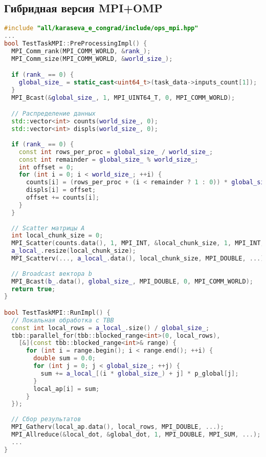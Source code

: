 \documentclass[12pt]{article}
\begin{document}
\subsection{Гибридная версия MPI+OMP}
\begin{lstlisting}[language=C++]
#include "all/karaseva_e_congrad/include/ops_mpi.hpp"
...
bool TestTaskMPI::PreProcessingImpl() {
  MPI_Comm_rank(MPI_COMM_WORLD, &rank_);
  MPI_Comm_size(MPI_COMM_WORLD, &world_size_);

  if (rank_ == 0) {
    global_size_ = static_cast<uint64_t>(task_data->inputs_count[1]);
  }
  MPI_Bcast(&global_size_, 1, MPI_UINT64_T, 0, MPI_COMM_WORLD);

  // Распределение данных
  std::vector<int> counts(world_size_, 0);
  std::vector<int> displs(world_size_, 0);
  
  if (rank_ == 0) {
    const int rows_per_proc = global_size_ / world_size_;
    const int remainder = global_size_ % world_size_;
    int offset = 0;
    for (int i = 0; i < world_size_; ++i) {
      counts[i] = (rows_per_proc + (i < remainder ? 1 : 0)) * global_size_;
      displs[i] = offset;
      offset += counts[i];
    }
  }
  
  // Scatter матрицы A
  int local_chunk_size = 0;
  MPI_Scatter(counts.data(), 1, MPI_INT, &local_chunk_size, 1, MPI_INT, 0, MPI_COMM_WORLD);
  a_local_.resize(local_chunk_size);
  MPI_Scatterv(..., a_local_.data(), local_chunk_size, MPI_DOUBLE, ...);
  
  // Broadcast вектора b
  MPI_Bcast(b_.data(), global_size_, MPI_DOUBLE, 0, MPI_COMM_WORLD);
  return true;
}

bool TestTaskMPI::RunImpl() {
  // Локальная обработка с TBB
  const int local_rows = a_local_.size() / global_size_;
  tbb::parallel_for(tbb::blocked_range<int>(0, local_rows),
    [&](const tbb::blocked_range<int>& range) {
      for (int i = range.begin(); i < range.end(); ++i) {
        double sum = 0.0;
        for (int j = 0; j < global_size_; ++j) {
          sum += a_local_[(i * global_size_) + j] * p_global[j];
        }
        local_ap[i] = sum;
      }
  });
  
  // Сбор результатов
  MPI_Gatherv(local_ap.data(), local_rows, MPI_DOUBLE, ...);
  MPI_Allreduce(&local_dot, &global_dot, 1, MPI_DOUBLE, MPI_SUM, ...);
  ...
}
\end{lstlisting}
\end{document}
